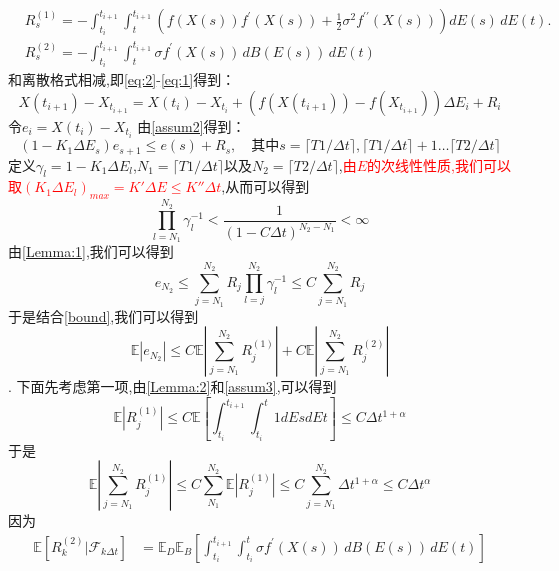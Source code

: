 \documentclass[12pt,final]{article}
\makeatletter
\theoremstyle{plain}
\renewcommand{\proofname}{Proof}
\theoremstyle{Definition}
\theoremstyle{Remark}
\renewenvironment{proof}[1][\proofname]{\par
	\pushQED{\qed}%
	\normalfont \topsep6\p@\@plus6\p@\relax
	\trivlist\item[\hskip\labelsep
	\bfseries #1\@addpunct{\,:\,}]\ignorespaces
}{%
	\popQED\endtrivlist\@endpefalse
}
\makeatother
\begin{document}
\begin{proof}
\begin{align*}
			& R_s^{(1)} = -\int_{t_i}^{t_{i+1}} \int_{t}^{t_{i+1}} \left( f(X(s)) f^{\prime}(X(s)) + \frac{1}{2} \sigma^2 f^{\prime\prime}(X(s)) \right) dE(s) \, dE(t).\\
			& R_s^{(2)} = -\int_{t_i}^{t_{i+1}} \int_{t}^{t_{i+1}} \sigma f^{\prime}(X(s)) \, dB(E(s)) \, dE(t)  
		\end{align*}
		和离散格式相减,即\cref{eq:2}-\cref{eq:1}得到：
		\begin{equation}
			X({t_{i+1}})-X_{t_{i+1}}=X({t_i})-X_{t_i}+(f{(X({t_{i+1}}))}-f{(X_{t_{i+1}})})\Delta E_{i}+R_{i}
		\end{equation}
		令$e_i = X({t_i})-X_{t_i}$
		由\cref{assum2}得到：
		\begin{equation}
			(1-K_1\Delta E_s)e_{s+1}\leq e(s)+R_{s},\quad\text{其中}s=\lceil T1/\Delta t \rceil,\lceil T1/\Delta t \rceil+1 \ldots \lceil T2/\Delta t \rceil
		\end{equation}
		定义$\gamma_l = 1-K_1\Delta E_l$,$N_1 = \lceil T1/\Delta t \rceil$以及$N_2 = \lceil T2/\Delta t \rceil$,\textcolor{red}{由$E$的次线性性质,我们可以取$(K_1\Delta E_l)_{max} = K'\Delta E \le K'' \Delta t$},从而可以得到
		\begin{equation}\label{bound}
			\prod\limits_{l=N_1}^{N_2}\gamma_l^{-1} < \frac{1}{(1-C\Delta t)^{N_2-N_1}} < \infty
		\end{equation}
		由\cref{Lemma:1},我们可以得到
		$$e_{N_2} \leq \sum\limits_{j=N_1}^{N_2}R_{j}\prod\limits_{l=j}^{N_2}\gamma_l^{-1} \le C \sum\limits_{j=N_1}^{N_2}R_{j}$$
		于是结合\cref{bound},我们可以得到
		$$\mathbb{E}  |e_{N_2}| \leq C\mathbb{E}\left|\sum\limits_{j=N_1}^{N_2}R_{j}^{(1)} \right| + C\mathbb{E}\left|\sum\limits_{j=N_1}^{N_2}R_{j}^{(2)} \right|$$.
		下面先考虑第一项,由\cref{Lemma:2}和\cref{assum3},可以得到
		\begin{equation}
			\mathbb{E} |R_j^{(1)}| \le C\mathbb{E} \left[ \int_{t_i}^{t_{i+1}}\int_{t_i}^{t}1dEsdEt \right] \le C\Delta t^{1+\alpha}
		\end{equation}
		于是
		\begin{equation}
			\mathbb{E}\left|\sum\limits_{j=N_1}^{N_2}R_{j}^{(1)}\right|\leq C\sum\limits_{N_1}^{N_2}\mathbb{E}\left|R_{j}^{(1)}\right| \leq
			C\sum\limits_{j=N_1}^{N_2}\Delta t^{1+\alpha} \le C\Delta t^\alpha
		\end{equation}
		因为
		\begin{align*}
			\mathbb{E}\left[ R_{k}^{(2)}|\mathcal{F}_{k\Delta t} \right] &= \mathbb{E}_D\mathbb{E}_B\left[ \int_{t_i}^{t_{i+1}} \int_{t_i}^{t} \sigma f^{\prime}(X(s)) \, dB(E(s)) \, dE(t) \right]\\

\end{align*}
\end{proof}
\end{document}
